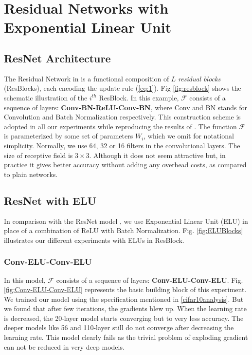 \documentclass[10pt,twocolumn,letterpaper]{article}
\begin{document}
\section{Residual Networks with Exponential Linear Unit}
\subsection{ResNet Architecture}

The Residual Network in \cite{[1]} is a functional composition of \(L\) \emph{residual blocks} (ResBlocks), each encoding the update rule (\ref{eq:1}). Fig \ref{fig:resblock} shows the schematic illustration of the \(i^{th}\) ResBlock. In this example, \(\mathcal{F}\) consists of a sequence of layers: \textbf{Conv-BN-ReLU-Conv-BN}, where Conv and BN stands for Convolution and Batch Normalization respectively. This construction scheme is adopted in all our experiments while reproducing the results of \cite{[1]}. The function \(\mathcal{F}\) is parameterized by some set of  parameters \(W_i\), which we omit for notational simplicity. Normally, we use  64, 32 or 16 filters in the convolutional layers. The size of receptive field is $3 \times 3$. Although it does not seem attractive but, in practice it gives better accuracy without adding any overhead costs, as compared to plain networks.

\subsection{ResNet with ELU}

In comparison with the ResNet model \cite{[1]}, we use Exponential Linear Unit (ELU) in place of a combination of ReLU with Batch Normalization.
Fig. \ref{fig:ELUBlocks} illustrates our different experiments with ELUs in ResBlock.

\subsubsection{Conv-ELU-Conv-ELU}

In this model, $\mathcal{F}$ consists of a sequence of layers: \textbf{Conv-ELU-Conv-ELU}. Fig. \ref{fig:Conv-ELU-Conv-ELU} represents the basic building block of this experiment. We trained our model using the specification mentioned in \ref{cifar10analysis}. But we found that after few iterations, the gradients blew up. When the learning rate is decreased, the 20-layer model starts converging but to very less accuracy. The deeper models like 56 and 110-layer still do not converge after decreasing the learning rate. This model clearly fails as the trivial problem of exploding gradient can not be reduced in very deep models.
\end{document}
